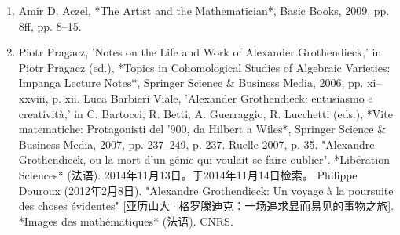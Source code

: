 \begin{enumerate}
\item Amir D. Aczel, *The Artist and the Mathematician*, Basic Books, 2009, pp. 8ff, pp. 8–15.  
\item Piotr Pragacz, 'Notes on the Life and Work of Alexander Grothendieck,' in Piotr Pragacz (ed.), *Topics in Cohomological Studies of Algebraic Varieties: Impanga Lecture Notes*, Springer Science & Business Media, 2006, pp. xi–xxviii, p. xii.  
Luca Barbieri Viale, 'Alexander Grothendieck: entusiasmo e creatività,' in C. Bartocci, R. Betti, A. Guerraggio, R. Lucchetti (eds.), *Vite matematiche: Protagonisti del '900, da Hilbert a Wiles*, Springer Science & Business Media, 2007, pp. 237–249, p. 237.  
Ruelle 2007, p. 35.  
"Alexandre Grothendieck, ou la mort d'un génie qui voulait se faire oublier". *Libération Sciences* (法语). 2014年11月13日。于2014年11月14日检索。  
Philippe Douroux (2012年2月8日). "Alexandre Grothendieck: Un voyage à la poursuite des choses évidentes" [亚历山大·格罗滕迪克：一场追求显而易见的事物之旅]. *Images des mathématiques* (法语). CNRS.
\end{enumerate}
